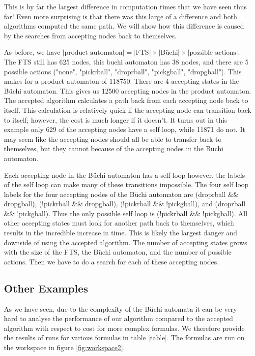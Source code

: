This is by far the largest difference in computation times that we have seen thus far! Even more surprising is that there was this large of a difference and both algorithms computed the same path. We will show how this difference is caused by the searches from accepting nodes back to themselves.

As before, we have $|\text{product automaton}| =|\text{FTS}| \times |\text{B\"uchi}| \times |\text{possible actions}|$. The FTS still has 625 nodes, this buchi automaton has 38 nodes, and there are 5 possible actions ("none", "pickrball", "droprball", "pickgball", "dropgball"). This makes for a product automaton of 118750. There are 4 accepting states in the B\"uchi automaton. This gives us 12500 accepting nodes in the product automaton. The accepted algorithm calculates a path back from each accepting node back to itself. This calculation is relatively quick if the accepting node can transition back to itself; however, the cost is much longer if it doesn't. It turns out in this example only 629 of the accepting nodes have a self loop, while 11871 do not. It may seem like the accepting nodes should all be able to transfer back to themselves, but they cannot because of the accepting nodes in the B\"uchi automaton. 

Each accepting node in the B\"uchi automaton has a self loop however, the labels of the self loop can make many of these transitions impossible. The four self loop labels for the four accepting nodes of the B\"uchi automaton are (droprball \&\& dropgball), (!pickrball \&\& dropgball), (!pickrball \&\& !pickgball), and (droprball \&\& !pickgball). Thus the only possible self loop is (!pickrball \&\& !pickgball). All other accepting states must look for another path back to themselves, which results in the incredible increase in time. This is likely the largest danger and downside of using the accepted algorithm. The number of accepting states grows with the size of the FTS, the B\"uchi automaton, and the number of possible actions. Then we have to do a search for each of these accepting nodes.  



\subsection{Other Examples}
As we have seen, due to the complexity of the B\"uchi automata it can be very hard to analyse the performance of our algorithm compared to the accepted algorithm with respect to cost for more complex formulas. We therefore provide the results of runs for various formulas in table \ref{table}. The formulas are run on the workspace in figure \ref{fig:workspace2}. 


